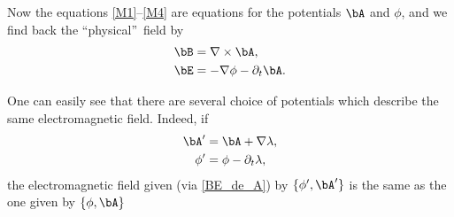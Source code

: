 Now the equations \eqref{M1}--\eqref{M4} are equations for the potentials $\bA$ and $\phi$, and we find back the ``physical''\ field by
\begin{subequations}\label{BE_de_A}
\begin{align}
    \bB&=\nabla\times\bA,\\
    \bE&=-\nabla\phi-\partial_t\bA.
\end{align}
\end{subequations}

One can easily see that there are several choice of potentials which describe the same electromagnetic field. Indeed, if
\begin{subequations}\label{jauge_A}
\begin{align}
    \bA'&=\bA+\nabla\lambda,\\
    \phi'&=\phi-\partial_t\lambda,
\end{align}
\end{subequations}
the electromagnetic field given (via \eqref{BE_de_A}) by $\{\phi',\bA'\}$ is the same as the one given by $\{\phi,\bA\}$

